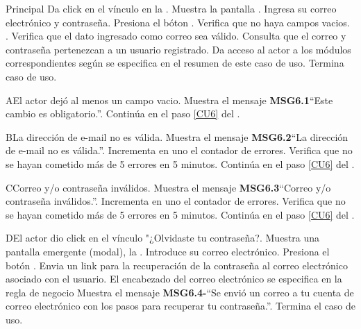 	\newpage
	\begin{UCtrayectoria}{Principal}
	\UCpaso[\UCactor] Da click en el vínculo  en la .	
	\UCpaso Muestra la pantalla .
	\UCpaso[\UCactor] Ingresa su correo electrónico y contraseña. 
	\UCpaso[\UCactor] Presiona el bóton .
	\UCpaso Verifica que no haya campos vacios. .
	\UCpaso Verifica que el dato ingresado como correo sea válido. 
	\UCpaso Consulta que el correo y contraseña pertenezcan a un usuario registrado.   
	\UCpaso Da acceso al actor a los módulos correspondientes según se especifica en el resumen de este caso de uso.  
	Termina caso de uso.
\end{UCtrayectoria}

	\begin{UCtrayectoriaA}{A}{El actor dejó al menos un campo vacio.}
		\UCpaso Muestra el mensaje {\bf MSG6.1}``Este cambio es obligatorio.''.
		\UCpaso Continúa en el paso \ref{CU6} del .
	\end{UCtrayectoriaA}

	\begin{UCtrayectoriaA}{B}{La dirección de e-mail no es válida.}
		\UCpaso Muestra el mensaje {\bf MSG6.2}``La dirección de e-mail no es válida.''.
		\UCpaso Incrementa en uno el contador de errores.
		\UCpaso Verifica que no se hayan cometido más de 5 errores en 5 minutos. 
		\UCpaso Continúa en el paso \ref{CU6} del .
	\end{UCtrayectoriaA}	
	
	\begin{UCtrayectoriaA}{C}{Correo y/o contraseña inválidos.}
		\UCpaso Muestra el mensaje {\bf MSG6.3}``Correo y/o contraseña inválidos.''.
		\UCpaso Incrementa en uno el contador de errores.
		\UCpaso Verifica que no se hayan cometido más de 5 errores en 5 minutos. 
		\UCpaso Continúa en el paso \ref{CU6} del .
	\end{UCtrayectoriaA}
	
	\begin{UCtrayectoriaA}{D}{El actor dio click en el vínculo "¿Olvidaste tu contraseña?.}
		\UCpaso Muestra una pantalla emergente (modal), la .
		\UCpaso[\UCactor] Introduce su correo electrónico.
		\UCpaso[\UCactor] Presiona el botón .
		\UCpaso Envia un link para la recuperación de la contraseña al correo electrónico asociado con el usuario. El encabezado del correo electrónico se especifica en la regla de negocio 
		\UCpaso Muestra el mensaje {\bf MSG6.4-}``Se envió un correo a tu cuenta de correo electrónico con los pasos para recuperar tu contraseña.''.
		\UCpaso[] Termina el caso de uso.
	\end{UCtrayectoriaA}
	

